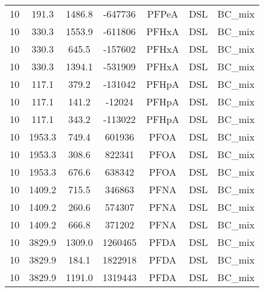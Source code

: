 \begin{longtable}[c]{ccccccc}
10 & 191.3 & 1486.8 & -647736 & PFPeA & DSL & BC\_mix \\
10 & 330.3 & 1553.9 & -611806 & PFHxA & DSL & BC\_mix \\
10 & 330.3 & 645.5 & -157602 & PFHxA & DSL & BC\_mix \\
10 & 330.3 & 1394.1 & -531909 & PFHxA & DSL & BC\_mix \\
10 & 117.1 & 379.2 & -131042 & PFHpA & DSL & BC\_mix \\
10 & 117.1 & 141.2 & -12024 & PFHpA & DSL & BC\_mix \\
10 & 117.1 & 343.2 & -113022 & PFHpA & DSL & BC\_mix \\
10 & 1953.3 & 749.4 & 601936 & PFOA & DSL & BC\_mix \\
10 & 1953.3 & 308.6 & 822341 & PFOA & DSL & BC\_mix \\
10 & 1953.3 & 676.6 & 638342 & PFOA & DSL & BC\_mix \\
10 & 1409.2 & 715.5 & 346863 & PFNA & DSL & BC\_mix \\
10 & 1409.2 & 260.6 & 574307 & PFNA & DSL & BC\_mix \\
10 & 1409.2 & 666.8 & 371202 & PFNA & DSL & BC\_mix \\
10 & 3829.9 & 1309.0 & 1260465 & PFDA & DSL & BC\_mix \\
10 & 3829.9 & 184.1 & 1822918 & PFDA & DSL & BC\_mix \\
10 & 3829.9 & 1191.0 & 1319443 & PFDA & DSL & BC\_mix \\ \bottomrule
\end{longtable}




